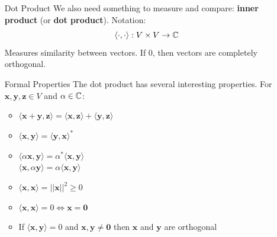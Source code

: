 \documentclass[11pt,a4paper]{article}
\begin{document}
\begin{itemize}
	      \begin{multicols}{2}
		      \begin{itemize}[font=\normalfont, nolistsep]
			      \item $\mathbf{x}+\mathbf{y} = \mathbf{y}+\mathbf{x}$
			      \item $(\mathbf{x}+\mathbf{y}) + \mathbf{z} = \mathbf{x}+(\mathbf{x}+\mathbf{y})$
			      \item $\alpha(\mathbf{x}+\mathbf{y}) = \alpha\mathbf{x} + \alpha\mathbf{y}$
			      \item $(\alpha+ \beta)\mathbf{x} = \alpha\mathbf{x} + \beta\mathbf{x}$
			      \item $\alpha(\beta\mathbf{x}) = (\alpha\beta)\mathbf{x}$
			      \item $\exists 0 \in V | \mathbf{x} + 0 = 0+\mathbf{x} = \mathbf{x}$
			      \item $\forall \mathbf{x} \in V \exists(-\mathbf{x}) | x+(- \mathbf{x}) = 0$
		      \end{itemize}
	      \end{multicols}
	\item[Dot Product]We also need something to measure and compare: \textbf{inner product} (or \textbf{dot product}). Notation:
	      \[ \langle\cdot,\cdot\rangle : V\times V \to \mathbb{C} \]
	      Measures similarity between vectors. If 0, then vectors are completely orthogonal.
	\item[Formal Properties]The dot product has several interesting properties. For $\mathbf{x},\mathbf{y},\mathbf{z} \in V$ and $\alpha\in\mathbb{C}$:
	      \begin{multicols}{2}
		      \begin{itemize}
			      \item $\langle\mathbf{x}+\mathbf{y},\mathbf{z}\rangle = \langle\mathbf{x},\mathbf{z}\rangle + \langle\mathbf{y},\mathbf{z}\rangle$
			      \item $\langle\mathbf{x},\mathbf{y}\rangle = \langle\mathbf{y},\mathbf{x}\rangle^*$
			      \item $\langle\alpha\mathbf{x},\mathbf{y}\rangle = \alpha^*\langle\mathbf{x},\mathbf{y}\rangle$\\
			            $\langle\mathbf{x},\alpha\mathbf{y}\rangle = \alpha\langle\mathbf{x},\mathbf{y}\rangle$
			      \item $\langle\mathbf{x},\mathbf{x}\rangle = ||\mathbf{x}||^2 \geq 0$
			      \item $\langle\mathbf{x},\mathbf{x}\rangle = 0 \iff \mathbf{x} = \mathbf{0}$
			      \item If $\langle\mathbf{x},\mathbf{y}\rangle = 0$ and $\mathbf{x,y} \neq \mathbf{0}$ then $\mathbf{x}$ and $\mathbf{y}$ are orthogonal

\end{itemize}
\end{multicols}
\end{itemize}
\end{document}
